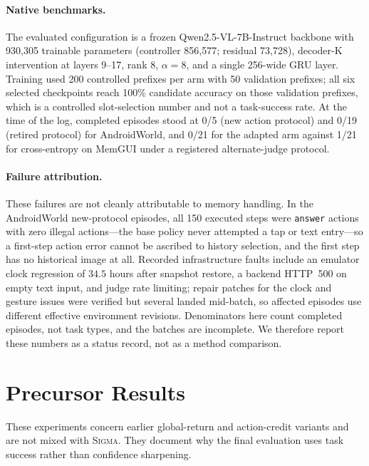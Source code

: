 \documentclass{article}
\newcommand{\method}{\textsc{Sigma}}
\begin{document}
\paragraph{Native benchmarks.} The evaluated configuration is a frozen
Qwen2.5-VL-7B-Instruct backbone with 930{,}305 trainable parameters (controller
856{,}577; residual 73{,}728), decoder-K intervention at layers 9--17, rank 8,
$\alpha=8$, and a single 256-wide GRU layer. Training used 200 controlled
prefixes per arm with 50 validation prefixes; all six selected checkpoints reach
100\% candidate accuracy on those validation prefixes, which is a controlled
slot-selection number and not a task-success rate. At the time of the log,
completed episodes stood at 0/5 (new action protocol) and 0/19 (retired
protocol) for AndroidWorld, and 0/21 for the adapted arm against 1/21 for
cross-entropy on MemGUI under a registered alternate-judge protocol.

\paragraph{Failure attribution.} These failures are not cleanly attributable to
memory handling. In the AndroidWorld new-protocol episodes, all 150 executed
steps were \texttt{answer} actions with zero illegal actions---the base policy
never attempted a tap or text entry---so a first-step action error cannot be
ascribed to history selection, and the first step has no historical image at
all. Recorded infrastructure faults include an emulator clock regression of
$34.5$ hours after snapshot restore, a backend HTTP~500 on empty text input, and
judge rate limiting; repair patches for the clock and gesture issues were
verified but several landed mid-batch, so affected episodes use different
effective environment revisions. Denominators here count completed episodes, not
task types, and the batches are incomplete. We therefore report these numbers as
a status record, not as a method comparison.

\section{Precursor Results}
\label{app:precursor}
These experiments concern earlier global-return and action-credit variants and are
not mixed with \method. They document why the final evaluation uses task success
rather than confidence sharpening.
\end{document}
